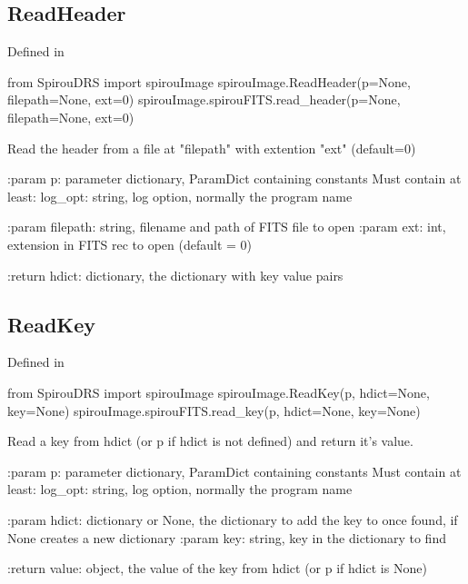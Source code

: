\noindent\begin{minipage}{\textwidth}
\subsection{ReadHeader}

Defined in \spirouImage{}

\begin{pythonbox}
from SpirouDRS import spirouImage
spirouImage.ReadHeader(p=None, filepath=None, ext=0)
spirouImage.spirouFITS.read_header(p=None, filepath=None, ext=0)
\end{pythonbox}

\begin{pythondocstring}
Read the header from a file at "filepath" with extention "ext" (default=0)

:param p: parameter dictionary, ParamDict containing constants
    Must contain at least:
            log_opt: string, log option, normally the program name

:param filepath: string, filename and path of FITS file to open
:param ext: int, extension in FITS rec to open (default = 0)

:return hdict: dictionary, the dictionary with key value pairs
\end{pythondocstring}
\end{minipage}


\noindent\begin{minipage}{\textwidth}
\subsection{ReadKey}

Defined in \spirouImage{}

\begin{pythonbox}
from SpirouDRS import spirouImage
spirouImage.ReadKey(p, hdict=None, key=None)
spirouImage.spirouFITS.read_key(p, hdict=None, key=None)
\end{pythonbox}

\begin{pythondocstring}
Read a key from hdict (or p if hdict is not defined) and return it's
value.

:param p: parameter dictionary, ParamDict containing constants
    Must contain at least:
            log_opt: string, log option, normally the program name

:param hdict: dictionary or None, the dictionary to add the key to once
              found, if None creates a new dictionary
:param key: string, key in the dictionary to find

:return value: object, the value of the key from hdict
               (or p if hdict is None)
\end{pythondocstring}
\end{minipage}

